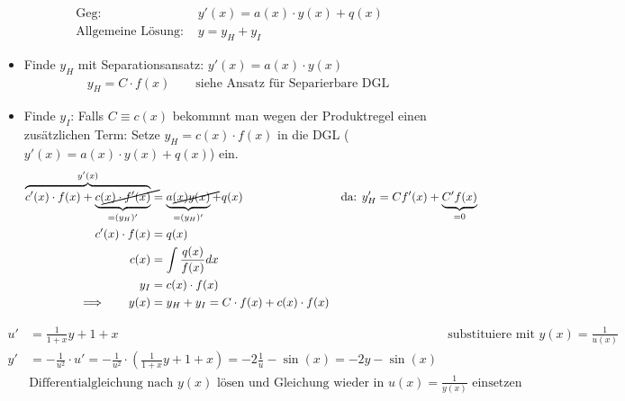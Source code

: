 \documentclass[a4paper]{article}
\begin{document}
		\begin{fmerke}
			\begin{align*}
				\text{Geg: } &y'(x) = a(x) \cdot y(x) + q(x)\\
				\text{Allgemeine Lösung: } &y= y_H + y_I
			\end{align*}
			
			\begin{itemize}
			 \item Finde $y_H$ mit Separationsansatz: $y'(x) = a(x) \cdot y(x)$
			 	\begin{align*}
			 		y_H = C \cdot f(x) \qquad \text{siehe Ansatz für Separierbare DGL }
			 	\end{align*}
			 \item Finde $y_I$: Falls $C \equiv c(x)$ bekommnt man wegen der Produktregel einen zusätzlichen Term: Setze $y_H = c(x) \cdot f(x)$ in die DGL ($y'(x) = a(x) \cdot y(x) + q(x)$) ein.
			 	\begin{align*}
			 		\overbrace{c'(x) \cdot f(x) + \underbrace{\cancel{c(x) \cdot f'(x)}}_{=(y_H)'}}^{y'(x)} &= \underbrace{\cancel{a(x) y(x) }}_{=(y_H)'} + q(x) &\text{da: } y'_H = Cf'(x)+ \underbrace{C'f(x)}_{=0}\\
			 		c'(x) \cdot f(x) &= q(x)\\
			 		c(x) &= \int \frac{q(x)}{f(x)} dx\\
			 		y_I &= c(x) \cdot f(x)\\
			 		\Longrightarrow \qquad y(x) &= y_H + y_I = C \cdot f(x) + c(x) \cdot f(x)
			 	\end{align*}
			\end{itemize}
		\end{fmerke}
		
		\begin{fmerke}
			\begin{align*}
				u' &= \frac{1}{1+x}y + 1+x & \text{substituiere mit }y(x) = \frac{1}{u(x)}\\
				y' &= - \frac{1}{u^2}\cdot u' = - \frac{1}{u^2} \cdot \left(\frac{1}{1+x}y + 1+x \right) = - 2\frac{1}{u}- \sin(x)= -2y - \sin(x)\\
				&\text{Differentialgleichung nach $y(x)$ lösen und Gleichung wieder in $u(x) = \frac{1}{y(x)}$ einsetzen}
			\end{align*}

		\end{fmerke}
\end{document}

